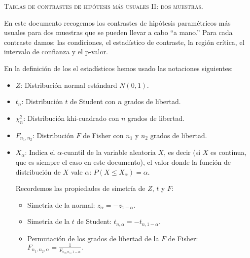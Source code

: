 \documentclass{article}
\begin{document}

\newcommand{\pp}[1]{P(#1\right)}
\newcommand{\vegeu}[1]{{(\footnotesize vegeu (#1))}}
\renewcommand{\thecas}{\Roman{cas}}
\newcommand{\posacas}{\addtocounter{cas}{1}{\bf \thecas}}


\begin{center}
\textsc{Tablas de contrastes de hipótesis más usuales II: dos muestras.}
\end{center}
\vspace*{2cm}

\noindent En este documento recogemos los contrastes de hipótesis paramétricos más usuales para dos muestras  que se pueden llevar a cabo ``a mano.'' Para cada contraste damos: las condiciones, el estadístico
de contraste, la región crítica, el intervalo de confianza y el p-valor.

En la definición de los el estadísticos hemos usado las notaciones siguientes:
\begin{itemize}
\item  $Z$: {Distribución normal estándard $N(0,1)$.} 
\item $t_n$: {Distribución
$t$ de Student con $n$ grados de libertad.} 
\item $\chi_n^2$: {Distribución
khi-cuadrado con $n$ grados de libertad.} 
\item $F_{n_1,n_2}$: {Distribución $F$ de
Fisher  con $n_1$ y $n_2$ grados de libertad.}
\item $X_\alpha$: Indica el $\alpha$-cuantil de la variable aleatoria $X$, es decir (si $X$ es continua, que es siempre el caso en este documento), el valor donde la
función de distribución de $X$ vale $\alpha$: $P(X\leq X_\alpha
)=\alpha$. 

Recordemos las propiedades de simetría de $Z$, $t$ y $F$:
\begin{itemize}
\item Simetría de la normal: $z_\alpha = -z_{1-\alpha}.$
\item Simetría de la $t$ de Student: $t_{n,\alpha} = -t_{n,1-\alpha}.$
\item Permutación de los grados de libertad de la $F$ de Fisher: $F_{n_1,n_2,\alpha}=\frac{1}{F_{n_2,n_1,1-\alpha}}.$
\end{itemize}
\end{itemize}
\end{document}
